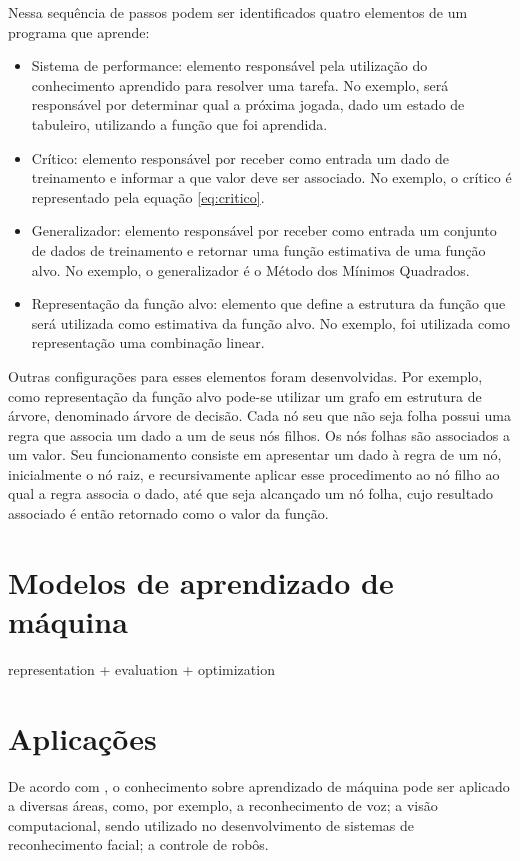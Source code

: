 Nessa sequência de passos podem ser identificados quatro elementos de um programa que aprende:

\begin{itemize}
\item Sistema de performance: elemento responsável pela utilização do conhecimento aprendido para resolver uma tarefa. No exemplo, será responsável por determinar qual a próxima jogada, dado um estado de tabuleiro, utilizando a função que foi aprendida. 
\item Crítico: elemento responsável por receber como entrada um dado de treinamento e informar a que valor deve ser associado. No exemplo, o crítico é representado pela equação \ref{eq:critico}.
\item Generalizador: elemento responsável por receber como entrada um conjunto de dados de treinamento e retornar uma função estimativa de uma função alvo. No exemplo, o generalizador é o Método dos Mínimos Quadrados.
\item Representação da função alvo: elemento que define a estrutura da função que será utilizada como estimativa da função alvo. No exemplo, foi utilizada como representação uma combinação linear.
\end{itemize}

Outras configurações para esses elementos foram desenvolvidas. Por exemplo, como representação da função alvo pode-se utilizar um grafo em estrutura de árvore, denominado árvore de decisão. Cada nó seu que não seja folha possui uma regra que associa um dado a um de seus nós filhos. Os nós folhas são associados a um valor. Seu funcionamento consiste em apresentar um dado à regra de um nó, inicialmente o nó raiz, e recursivamente aplicar esse procedimento ao nó filho ao qual a regra associa o dado, até que seja alcançado um nó folha, cujo resultado associado é então retornado como o valor da função.

\section{Modelos de aprendizado de máquina}
representation + evaluation + optimization \cite{ML_know}

\section{Aplicações}

De acordo com \cite{Mitchell_discipline}, o conhecimento sobre aprendizado de máquina pode ser aplicado a diversas áreas, como, por exemplo, a reconhecimento de voz; a visão computacional, sendo utilizado no desenvolvimento de sistemas de reconhecimento facial; a controle de robôs.